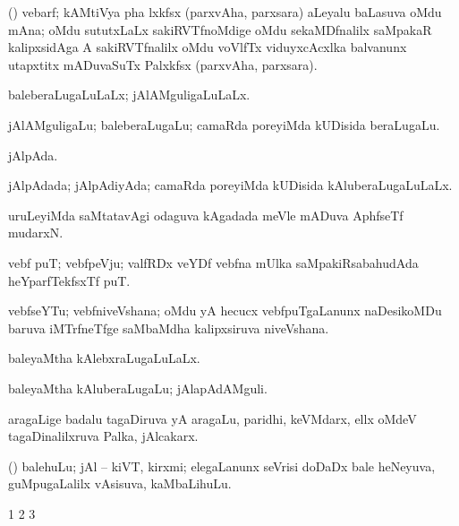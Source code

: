 {\bentry
{} 
\gl{\nA}
\expl{}
\bmng
(\Bwvi) vebarf; kAMtiVya pha lxkfsx (parxvAha, parxsara) aLeyalu baLasuva oMdu mAna; oMdu sututxLaLx sakiRVTfnoMdige oMdu sekaMDfnalilx saMpakaR kalipxsidAga A sakiRVTfnalilx oMdu voVlfTx viduyxcAcxlka balvanunx utapxtitx mADuvaSuTx Palxkfsx (parxvAha, parxsara). 
\emng
\eentry

\bentry
{} 
\gl{\gu}
\expl{}
\bmng
baleberaLugaLuLaLx; jAlAMguligaLuLaLx. 
\emng
\eentry

\bentry
{} 
\gl{\nA}
\expl{}
\bmng
jAlAMguligaLu; baleberaLugaLu; camaRda poreyiMda kUDisida beraLugaLu. 
\emng
\eentry

\bentry
{} 
\gl{\nA}
\expl{}
\bmng
jAlpAda. 
\emng
\eentry

\bentry
{} 
\gl{\gu}
\expl{}
\bmng
jAlpAdada; jAlpAdiyAda; camaRda poreyiMda kUDisida kAluberaLugaLuLaLx. 
\emng
\eentry

\bentry
{} 
\gl{\nA}
\expl{}
\bmng
uruLeyiMda saMtatavAgi odaguva kAgadada meVle mADuva AphfseTf mudarxN. 
\emng
\eentry

\bentry
{} 
\gl{\nA}
\expl{}
\bmng
vebf puT; vebfpeVju; valfRDx veYDf vebfna mUlka saMpakiRsabahudAda heYparfTekfsxTf puT. 
\emng
\eentry

\bentry
{} 
\gl{\nA}
\expl{}
\bmng
vebfseYTu; vebfniveVshana; oMdu yA hecucx vebfpuTgaLanunx naDesikoMDu baruva iMTrfneTfge saMbaMdha kalipxsiruva niveVshana. 
\emng
\eentry

\bentry
{} 
\gl{\gu}
\expl{}
\bmng
baleyaMtha kAlebxraLugaLuLaLx. 
\emng
\eentry

\bentry
{} 
\gl{\nA}
\expl{}
\bmng
baleyaMtha kAluberaLugaLu; jAlapAdAMguli. 
\emng
\eentry

\bentry
{} 
\gl{\nA}
\expl{}
\bmng
aragaLige badalu tagaDiruva yA aragaLu, paridhi, keVMdarx, ellx oMdeV tagaDinalilxruva Palka, jAlcakarx. 
\emng
\eentry

\bentry
{} 
\gl{\nA}
\expl{}
\bmng
(\ame) balehuLu; jAl -- kiVT, kirxmi; elegaLanunx seVrisi doDaDx bale heNeyuva, guMpugaLalilx vAsisuva, kaMbaLihuLu. 
\emng
\eentry

\bentry
{} 
\expl{}
\bmng
\bnum
\num{1}  
\num{2}  
\num{3}  
\enum
\emng
\eentry

}
